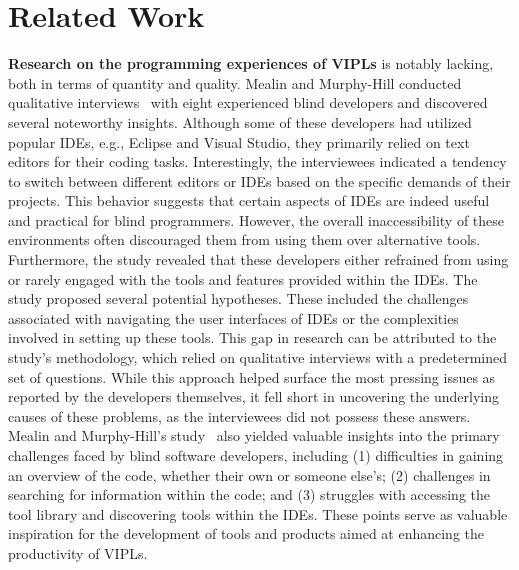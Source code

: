 \section{Related Work}
\label{sec:related}

{\bf Research on the programming experiences of VIPLs} is notably
lacking, both in terms of quantity and quality. Mealin and Murphy-Hill
conducted qualitative interviews~\cite{mealin-vlhcc12} with eight experienced blind
developers and discovered several noteworthy insights. Although some
of these developers had utilized popular IDEs, e.g., Eclipse and
Visual Studio, they primarily relied on text editors for their coding
tasks. Interestingly, the interviewees indicated a tendency to switch
between different editors or IDEs based on the specific demands of
their projects. This behavior suggests that certain aspects of IDEs
are indeed useful and practical for blind programmers. However, the
overall inaccessibility of these environments often discouraged them
from using them over alternative tools.
Furthermore, the study revealed that these developers either refrained
from using or rarely engaged with the tools and features provided
within the IDEs.
The study proposed several potential hypotheses. These included the
challenges associated with navigating the user interfaces of IDEs or
the complexities involved in setting up these tools. This gap in
research can be attributed to the study's methodology, which relied on
qualitative interviews with a predetermined set of questions. While
this approach helped surface the most pressing issues as reported by
the developers themselves, it fell short in uncovering the underlying
causes of these problems, as the interviewees did not possess these
answers.
Mealin and Murphy-Hill's study~\cite{mealin-vlhcc12} also yielded valuable insights into
the primary challenges faced by blind software developers, including
(1) difficulties in gaining an overview of the code, whether their own
or someone else's; (2) challenges in searching for information within
the code; and (3) struggles with accessing the tool library and
discovering tools within the IDEs. These points serve as valuable
inspiration for the development of tools and products aimed at
enhancing the productivity of VIPLs.

